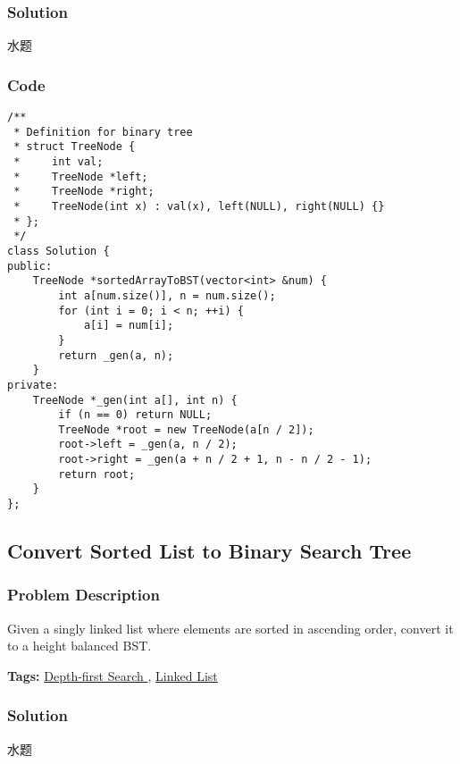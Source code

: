 \documentclass{article}
\begin{document}
\begin{CJK*}{UTF8}{gkai}
\subsubsection*{Solution}
水题

\subsubsection*{Code}
\begin{lstlisting}
/**
 * Definition for binary tree
 * struct TreeNode {
 *     int val;
 *     TreeNode *left;
 *     TreeNode *right;
 *     TreeNode(int x) : val(x), left(NULL), right(NULL) {}
 * };
 */
class Solution {
public:
    TreeNode *sortedArrayToBST(vector<int> &num) {
        int a[num.size()], n = num.size();
        for (int i = 0; i < n; ++i) {
            a[i] = num[i];
        }
        return _gen(a, n);
    }
private:
    TreeNode *_gen(int a[], int n) {
        if (n == 0) return NULL;
        TreeNode *root = new TreeNode(a[n / 2]);
        root->left = _gen(a, n / 2);
        root->right = _gen(a + n / 2 + 1, n - n / 2 - 1);
        return root;
    }
}; 
\end{lstlisting}


\subsection{ Convert Sorted List to Binary Search Tree }
\label{ Convert Sorted List to Binary Search Tree }

\subsubsection*{Problem Description}
Given a singly linked list where elements are sorted in ascending order, convert it to a height balanced BST.


\textbf{Tags: }
\hyperref[ Depth-first Search ]{ Depth-first Search },  \hyperref[ Linked List ]{ Linked List }



\subsubsection*{Solution}
水题


\end{CJK*}
\end{document}
